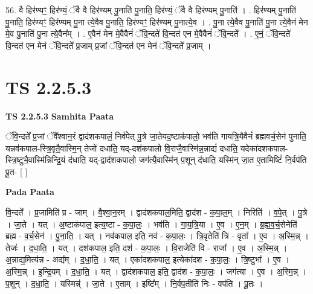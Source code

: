\documentclass[17pt]{extarticle}
\begin{document}
56. वै हिर॑ण्यꣳ॒॒ हिर॑ण्यं॒ ॅवै वै हिर॑ण्यम् पु॒नाति॑ पु॒नाति॒ हिर॑ण्यं॒ ॅवै वै हिर॑ण्यम् पु॒नाति॑ । . हिर॑ण्यम् पु॒नाति॑ पु॒नाति॒ हिर॑ण्यꣳ॒॒ हिर॑ण्यम् पु॒ना त्ये॒वैव पु॒नाति॒ हिर॑ण्यꣳ॒॒ हिर॑ण्यम् पु॒नात्ये॒व । . पु॒ना त्ये॒वैव पु॒नाति॑ पु॒ना त्ये॒वैन॑ मेन मे॒व पु॒नाति॑ पु॒ना त्ये॒वैन᳚म् । . ए॒वैन॑ मेन मे॒वैवैनं॑ ॅवि॒न्दते॑ वि॒न्दत॑ एन मे॒वैवैनं॑ ॅवि॒न्दते᳚ । . ए॒नं॒ ॅवि॒न्दते॑ वि॒न्दत॑ एन मेनं ॅवि॒न्दते᳚ प्र॒जाम् प्र॒जां ॅवि॒न्दत॑ एन मेनं ॅवि॒न्दते᳚ प्र॒जाम् । \newline
\pagebreak
{}
\section*{ TS 2.2.5.3 }

\textbf{TS 2.2.5.3 } \newline
\textbf{Samhita Paata} \newline

ॅवि॒न्दते᳚ प्र॒जां ॅवै᳚श्वान॒रं द्वाद॑शकपालं॒ निर्व॑पेत् पु॒त्रे जा॒तेयद॒ष्टाक॑पालो॒ भव॑ति गायत्रि॒यैवैनं॑ ब्रह्मवर्च॒सेन॑ पुनाति॒ यन्नव॑कपाल-स्त्रि॒वृतै॒वास्मि॒न् तेजो॑ दधाति॒ यद्-दश॑कपालो वि॒राजै॒वास्मि॑न्न॒न्नाद्यं॑ दधाति॒ यदेका॑दशकपाल- स्त्रि॒ष्टुभै॒वास्मि॑न्निन्द्रि॒यं द॑धाति॒ यद्-द्वाद॑शकपालो॒ जग॑त्यै॒वास्मि॑न् प॒शून् द॑धाति॒ यस्मि॑न् जा॒त ए॒तामिष्टिं॑ नि॒र्वप॑ति पू॒त- [  ] \newline

\textbf{Pada Paata} \newline

वि॒न्दते᳚ । प्र॒जामिति॑ प्र - जाम् । वै॒श्वा॒न॒रम् । द्वाद॑शकपाल॒मिति॒ द्वाद॑श - क॒पा॒ल॒म् । निरिति॑ । व॒पे॒त् । पु॒त्रे । जा॒ते । यत् । अ॒ष्टाक॑पाल॒ इत्य॒ष्टा - क॒पा॒लः॒ । भव॑ति । गा॒य॒त्रि॒या । ए॒व । ए॒न॒म् । ब्र॒ह्म॒व॒र्च॒सेनेति॑ ब्रह्म - व॒र्च॒सेन॑ । पु॒ना॒ति॒ । यत् । नव॑कपाल॒ इति॒ नव॑ - क॒पा॒लः॒ । त्रि॒वृतेति॑ त्रि - वृता᳚ । ए॒व । अ॒स्मि॒न्न् । तेजः॑ । द॒धा॒ति॒ । यत् । दश॑कपाल॒ इति॒ दश॑ - क॒पा॒लः॒ । वि॒राजेति॑ वि - राजा᳚ । ए॒व । अ॒स्मि॒न्न् । अ॒न्नाद्य॒मित्य॑न्न - अद्य᳚म् । द॒धा॒ति॒ । यत् । एका॑दशकपाल॒ इत्येका॑दश - क॒पा॒लः॒ । त्रि॒ष्टुभा᳚ । ए॒व । अ॒स्मि॒न्न् । इ॒न्द्रि॒यम् । द॒धा॒ति॒ । यत् । द्वाद॑शकपाल॒ इति॒ द्वाद॑श - क॒पा॒लः॒ । जग॑त्या । ए॒व । अ॒स्मि॒न्न् । प॒शून् । द॒धा॒ति॒ । यस्मिन्न्॑ । जा॒ते । ए॒ताम् । इष्टि᳚म् । नि॒र्वप॒तीति॑ निः - वप॑ति । पू॒तः ।  \newline
\end{document}

